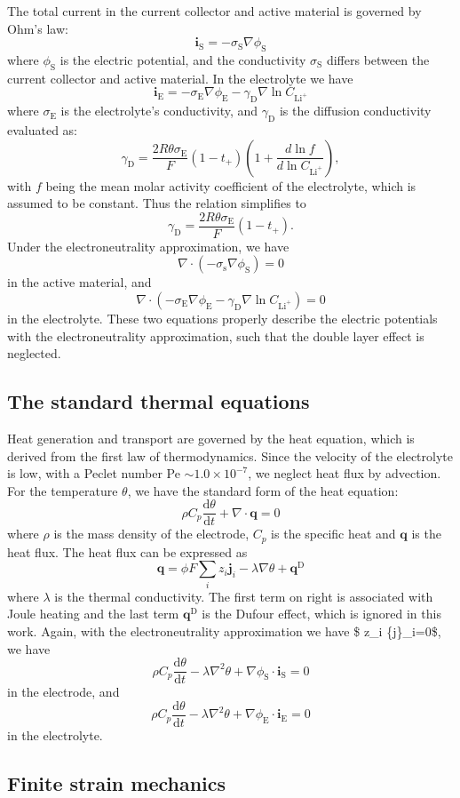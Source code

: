 The total current in the current collector and active material is governed by Ohm's law\-: \[ \boldsymbol{i}_\text{S}=-\sigma_\text{S} \nabla\phi_\text{S} \] where $\phi_\text{S}$ is the electric potential, and the conductivity $\sigma_\text{S}$ differs between the current collector and active material. In the electrolyte we have \[ \boldsymbol{i}_\text{E}=-\sigma_\text{E}\nabla\phi_\text{E}-\gamma_\text{D}\nabla\ln C_{\text{Li}^+} \] where $\sigma_\text{E}$ is the electrolyte's conductivity, and $\gamma_\text{D}$ is the diffusion conductivity evaluated as\-: \[ \gamma_\text{D}=\frac{2R\theta \sigma_\text{E}}{F}\left(1-t_+\right)\left(1+\frac{d \ln f}{d\ln C_{\text{Li}^+}}\right), \] with $f$ being the mean molar activity coefficient of the electrolyte, which is assumed to be constant. Thus the relation simplifies to \[ \gamma_\text{D}=\frac{2 R\theta \sigma_\text{E}}{F}\left(1-t_+\right). \] Under the electroneutrality approximation, we have \[ \nabla\cdot (- \sigma_\text{s}\nabla\phi_\text{S})=0 \] in the active material, and \[ \nabla\cdot\left(-\sigma_\text{E}\nabla\phi_\text{E}-\gamma_\text{D}\nabla\ln C_{\text{Li}^+}\right)=0 \] in the electrolyte. These two equations properly describe the electric potentials with the electroneutrality approximation, such that the double layer effect is neglected.\hypertarget{battery_particle_section2}{}\subsection{The standard thermal equations}\label{battery_particle_section2}
Heat generation and transport are governed by the heat equation, which is derived from the first law of thermodynamics. Since the velocity of the electrolyte is low, with a Peclet number Pe $\sim 1.0\times 10^{-7}$, we neglect heat flux by advection. For the temperature $\theta$, we have the standard form of the heat equation\-: \[ \rho C_p\frac{\text{d}\theta}{\text{d}t}+\nabla \cdot\boldsymbol{q}=0 \] where $\rho$ is the mass density of the electrode, $C_p$ is the specific heat and $\boldsymbol{q}$ is the heat flux. The heat flux can be expressed as \[ \boldsymbol{q}=\phi F\sum_i z_i\boldsymbol{j}_i-\lambda\nabla\theta+\boldsymbol{q}^\text{D} \] where $\lambda$ is the thermal conductivity. The first term on right is associated with Joule heating and the last term $\boldsymbol{q}^\text{D}$ is the Dufour effect, which is ignored in this work. Again, with the electroneutrality approximation we have \$ z\-\_\-i \{j\}\-\_\-i=0\$, we have \[ \rho C_p\frac{\text{d}\theta}{\text{d}t}-\lambda \nabla^2\theta+\nabla\phi_\text{S}\cdot\boldsymbol{i}_\text{S}=0 \] in the electrode, and \[ \rho C_p\frac{\text{d}\theta}{\text{d}t}-\lambda \nabla^2\theta+\nabla\phi_\text{E}\cdot\boldsymbol{i}_\text{E}=0 \] in the electrolyte.\hypertarget{battery_particle_section3}{}\subsection{Finite strain mechanics}\label{battery_particle_section3}
